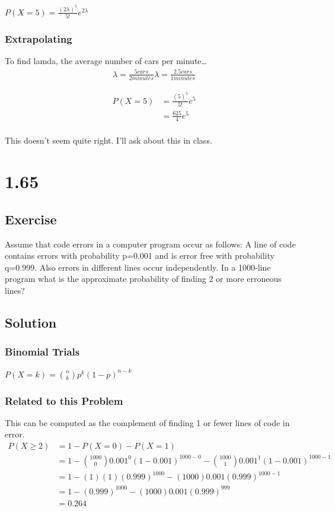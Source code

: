 \documentclass[12pt]{article}
\begin{document}
$P(X=5) = \frac{(2 \lambda)^5}{5!}e^{2 \lambda}$

\subsubsection{Extrapolating}
To find lamda, the average number of cars per minute\ldots
\begin{align*}
\lambda = \frac{5 cars}{2 minutes}
\lambda = \frac{2.5 cars}{1 minutes}
\end{align*}

\begin{align*}
P(X=5) &= \frac{(5)^5}{5!}e^{5}\\
 &= \frac{625}{4}e^{5}\\
\end{align*}

This doesn't seem quite right. I'll ask about this in class.

\section{1.65}
\subsection{Exercise}
Assume that code errors in a computer program occur as follows: A line of code contains errors with probability p=0.001 and
is error free with probability q=0.999. Also errors in different lines occur independently. In a 1000-line program what 
is the approximate probability of finding 2 or more erroneous lines?

\subsection{Solution}
\subsubsection{Binomial Trials}
$P(X=k)=\binom{n}{k}p^k(1-p)^{n-k}$ \\

\subsubsection{Related to this Problem}
This can be computed as the complement of finding 1 or fewer lines of code in error.
\begin{align*}
P(X\geq2)&=1-P(X=0)-P(X=1)\\
&=1-\binom{1000}{0}0.001^0(1-0.001)^{1000-0}-\binom{1000}{1}0.001^1(1-0.001)^{1000-1}\\
&=1-(1)(1)(0.999)^{1000}-(1000)0.001(0.999)^{1000-1}\\
&=1-(0.999)^{1000}-(1000)0.001(0.999)^{999}\\
&=0.264\\
\end{align*}
\end{document}
